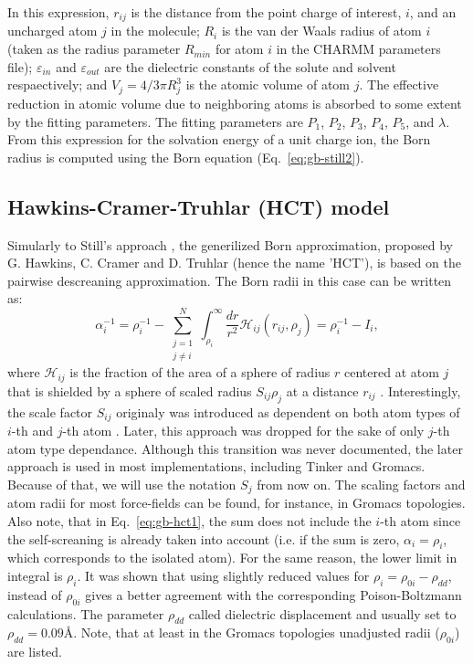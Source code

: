 \documentclass[11pt]{book}
\begin{document}
In this expression, $r_{ij}$ is the distance from the point charge of interest, $i$, and an uncharged atom $j$ in the molecule; $R_{i}$ is the van der Waals radius of atom $i$ (taken as the radius parameter $R_{min}$ for atom $i$ in the CHARMM parameters file); $\varepsilon_{in}$ and $\varepsilon_{out}$ are the dielectric constants of the solute and solvent respaectively; and $V_{j}=4/3\pi R_{j}^{3}$ is the atomic volume of atom $j$. The effective reduction in atomic volume due to neighboring atoms is absorbed to some extent by the fitting parameters. The fitting parameters are $P_{1}$, $P_{2}$, $P_{3}$, $P_{4}$, $P_{5}$, and $\lambda$. From this expression for the solvation energy of a unit charge ion, the Born radius is computed using the Born equation (Eq.~\ref{eq:gb-still2}).


\subsection{Hawkins-Cramer-Truhlar (HCT) model}

Simularly to Still's approach \cite{StillJACS90}, the generilized Born approximation, proposed by G. Hawkins, C. Cramer and D. Truhlar (hence the name 'HCT'), is based on the pairwise descreaning approximation. The Born radii in this case can be written as:
\begin{equation}\label{eq:gb-hct1}
\alpha_{i}^{-1}=\rho_{i}^{-1}-\sum_{\substack{j=1\\j\ne i}}^{N}\int_{\rho_{i}}^{\infty}\frac{dr}{r^{2}}\mathscr{H}_{ij}(r_{ij},\rho_{j})=\rho_{i}^{-1}-I_{i},
\end{equation}
where $\mathscr{H}_{ij}$ is the fraction of the area of a sphere of radius $r$ centered at atom $j$ that is shielded by a sphere of scaled radius $S_{ij}\rho_{j}$ at a distance $r_{ij}$ \cite{HawkinsJPC96,HawkinsCPL95}. Interestingly, the scale factor $S_{ij}$ originaly was introduced as dependent on both atom types of $i$-th and $j$-th atom \cite{HawkinsJPC96}. Later, this approach was dropped for the sake of only $j$-th atom type dependance. Although this transition was never documented, the later approach is used in most implementations, including Tinker and Gromacs. Because of that, we will use the notation $S_{j}$ from now on. The scaling factors and atom radii for most force-fields can be found, for instance, in Gromacs topologies. Also note, that in Eq.~\ref{eq:gb-hct1}, the sum does not include the $i$-th atom since the self-screaning is already taken into account (i.e. if the sum is zero, $\alpha_{i}=\rho_{i}$, which corresponds to the isolated atom). For the same reason, the lower limit in integral is $\rho_{i}$. It was shown that using slightly reduced values for $\rho_{i}=\rho_{0i}-\rho_{dd}$, instead of $\rho_{0i}$ gives a better agreement with the corresponding Poison-Boltzmann calculations. The parameter $\rho_{dd}$ called dielectric displacement and usually set to $\rho_{dd}=0.09$\AA. Note, that at least in the Gromacs topologies unadjusted radii ($\rho_{0i}$) are listed.
\end{document}
